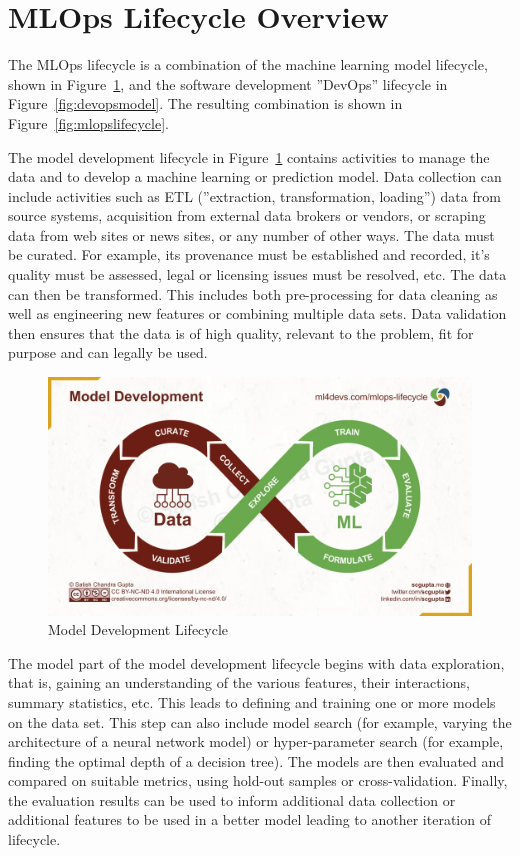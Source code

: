 \section{MLOps Lifecycle Overview}

The MLOps lifecycle is a combination of the machine learning model lifecycle, shown in Figure~\ref{fig:modellifecycle}, and the software development ''DevOps'' lifecycle in Figure~\ref{fig:devopsmodel}. The resulting combination is shown in Figure~\ref{fig:mlopslifecycle}. 

The model development lifecycle in Figure~\ref{fig:modellifecycle} contains activities to manage the data and to develop a machine learning or prediction model. Data collection can include activities such as ETL (''extraction, transformation, loading'') data from source systems, acquisition from external data brokers or vendors, or scraping data from web sites or news sites, or any number of other ways. The data must be curated. For example, its provenance must be established and recorded, it's quality must be assessed, legal or licensing issues must be resolved, etc. The data can then be transformed. This includes both pre-processing for data cleaning as well as engineering new features or combining multiple data sets. Data validation then ensures that the data is of high quality, relevant to the problem, fit for purpose and can legally be used. 

\begin{figure}[h]
\centering
\includegraphics[width=.8\textwidth]{mlmodel.jpeg}
\caption{Model Development Lifecycle}
\label{fig:modellifecycle}
\end{figure}

The model part of the model development lifecycle begins with data exploration, that is, gaining an understanding of the various features, their interactions, summary statistics, etc. This leads to defining and training one or more models on the data set. This step can also include model search (for example, varying the architecture of a neural network model) or hyper-parameter search (for example, finding the optimal depth of a decision tree). The models are then evaluated and compared on suitable metrics, using hold-out samples or cross-validation. Finally, the evaluation results can be used to inform additional data collection or additional features to be used in a better model leading to another iteration of lifecycle.

